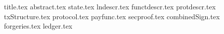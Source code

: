 \documentclass[11pt]{llncs}
\begin{document}
\pagestyle{plain}
{title.tex}
{abstract.tex}
{state.tex}
{lndescr.tex}
{functdescr.tex}
{protdescr.tex}
{txStructure.tex}
{protocol.tex}
{payfunc.tex}
{secproof.tex}
{combinedSign.tex}
{forgeries.tex}
{ledger.tex}


\end{document}
